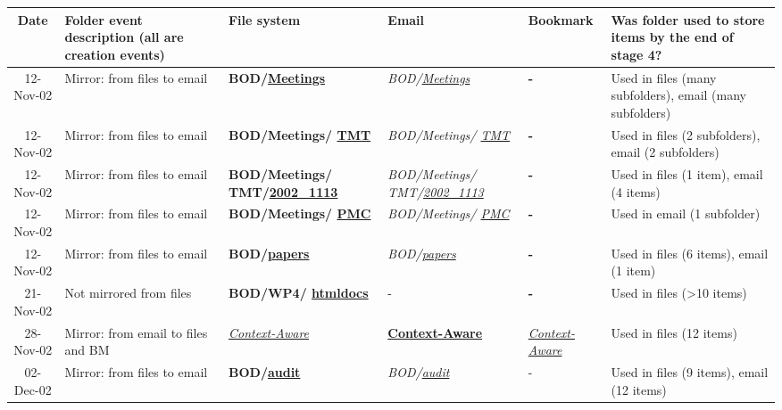 \begin{table}[hbtp]
\begin{center}
\begin{footnotesize}
\setlength{\extrarowheight}{2pt}
\begin{tabular}{|c|p{2.5cm}|p{2cm}|p{2cm}|p{2cm}|p{2.5cm}|}
\hline
{\bf Date} & {\bf Folder event description (all are creation events)} & {\bf File system} & {\bf Email} & {\bf Bookmark} & {\bf Was folder used to store items by the end of stage 4?} \\
\hline
 12-Nov-02 & Mirror: from files to email & {\bf BOD/\underline{Meetings}} & {\it BOD/\underline{Meetings}} &    {\bf -} & Used in files (many subfolders), email (many subfolders) \\
\hline
 12-Nov-02 & Mirror: from files to email & {\bf BOD/Meetings/ \underline{TMT}} & {\it BOD/Meetings/ \underline{TMT}} &    {\bf -} & Used in files (2 subfolders), email (2 subfolders) \\
\hline
 12-Nov-02 & Mirror: from files to email & {\bf BOD/Meetings/ TMT/\underline{2002\_1113}} & {\it BOD/Meetings/ TMT/\underline{2002\_1113}} &    {\bf -} & Used in files (1 item), email (4 items) \\
\hline
 12-Nov-02 & Mirror: from files to email & {\bf BOD/Meetings/ \underline{PMC}} & {\it BOD/Meetings/ \underline{PMC}} &    {\bf -} & Used in email (1 subfolder) \\
\hline
 12-Nov-02 & Mirror: from files to email & {\bf BOD/\underline{papers}} & {\it BOD/\underline{papers}} &    {\bf -} & Used in files (6 items), email (1 item) \\
\hline
 21-Nov-02 & Not mirrored from files & {\bf BOD/WP4/ \underline{htmldocs}} &          - &    {\bf -} & Used in files (>10 items) \\
\hline
 28-Nov-02 & Mirror: from email to files and BM & {\it \underline{Context-Aware}} & {\bf \underline{Context-Aware}} & {\it \underline{Context-Aware}} & Used in files (12 items) \\
\hline
 02-Dec-02 & Mirror: from files to email & {\bf BOD/\underline{audit}} & {\it BOD/\underline{audit}} &          - & Used in files (9 items), email (12 items) \\

\end{tabular}
\end{footnotesize}
\end{center}
\end{table}
